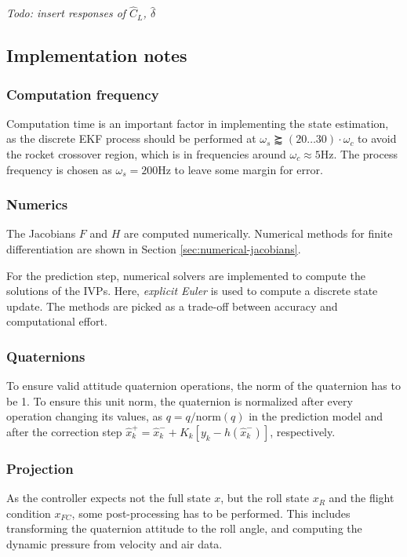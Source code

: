 \emph{Todo: insert responses of $\hat C_L$, $\hat \delta$}

\subsection{Implementation notes}
\label{sec:estimator-implementation}

\subsubsection{Computation frequency}
Computation time is an important factor in implementing the state estimation, as the discrete EKF process should be performed at $\omega_s \succapprox (20 \dots 30) \cdot \omega_c$ \cite{werner2021} to avoid the rocket crossover region, which is in frequencies around $ \omega_c \approx 5\mathrm{Hz}$.
The process frequency is chosen as $\omega_s = 200\mathrm{Hz}$ to leave some margin for error.

\subsubsection{Numerics}
The Jacobians $F$ and $H$ are computed numerically. 
Numerical methods for finite differentiation are shown in Section \ref{sec:numerical-jacobians}.

For the prediction step, numerical solvers are implemented to compute the solutions of the IVPs.
Here, \textit{explicit Euler} is used to compute a discrete state update.
The methods are picked as a trade-off between accuracy and computational effort.

\subsubsection{Quaternions}
To ensure valid attitude quaternion operations, the norm of the quaternion has to be 1.
To ensure this unit norm, the quaternion is normalized after every operation changing its values, as $q = q/\mathrm{norm}(q)$ in the prediction model and after the correction step $\hat x_{k}^{+} = \hat x_{k}^{-} + K_{k} \left[ y_{k} - h(\hat x_{k}^{-}) \right]$, respectively.

\subsubsection{Projection}
As the controller expects not the full state $x$, but the roll state $x_R$ and the flight condition $x_{FC}$, some post-processing has to be performed.
This includes transforming the quaternion attitude to the roll angle, and computing the dynamic pressure from velocity and air data.

